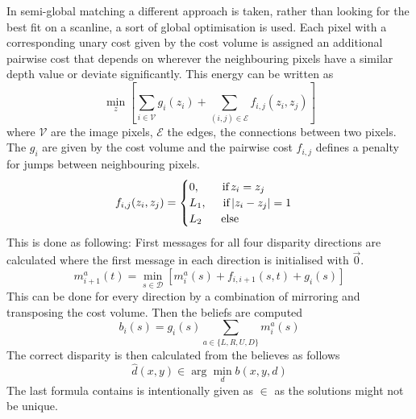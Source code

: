\documentclass{article}
\begin{document}
In semi-global matching a different approach is taken, rather than looking for the best fit on a scanline, a sort of global optimisation is used. Each pixel with a corresponding unary cost given by the cost volume is assigned an additional pairwise cost that depends on wherever the neighbouring pixels have a similar depth value or deviate significantly. This energy can be written as
\begin{equation}
\min_z \left[ \sum_{i \in \mathcal{V}} g_i (z_i) + \sum_{(i,j) \in \mathcal{E}} f_{i,j} (z_i, z_j) \right]
\end{equation}
where $\mathcal{V}$ are the image pixels, $\mathcal{E}$ the edges, the connections between two pixels. The $g_i$ are given by the cost volume and the pairwise cost $f_{i,j}$ defines a penalty for jumps between neighbouring pixels.
\begin{equation}
f_{i,j} (z_i, z_j) = \begin{cases}
0, \hspace{0.7cm} \text{if} \, z_i = z_j \\
L_1, \hspace{0.5cm} \text{if} \, |z_i - z_j| = 1\\
L_2\phantom{,} \hspace{0.5cm} \text{else}
\end{cases}
\end{equation}
This is done as following: First messages for all four disparity directions are calculated where the first message in each direction is initialised with $\vec 0$.
\begin{equation}
m_{i+1}^a(t) = \min_{s \in \mathcal{D}} \left[ m_i^a(s) + f_{i, i+1} (s,t) + g_i(s) \right]
\end{equation}
This can be done for every direction by a combination of mirroring and transposing the cost volume. Then the beliefs are computed
\begin{equation}
b_i(s) = g_i(s) \sum_{a \in \{ L,R,U,D \}} m_i^a(s)
\end{equation}
The correct disparity is then calculated from the believes as follows
\begin{equation}
\hat{d} (x,y) \in \arg \min_d b(x,y,d)
\end{equation}
The last formula contains is intentionally given as $\in$ as the solutions might not be unique.
\end{document}
